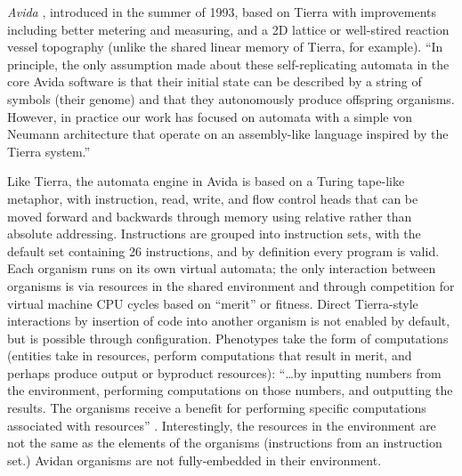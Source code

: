 \emph{Avida} \parencite{Ofria2004}, introduced in the summer of 1993, based on Tierra with improvements including better metering and measuring, and a 2D lattice or well-stired reaction vessel topography (unlike the shared linear memory of Tierra, for example). ``In principle, the only assumption made about these self-replicating automata in the core Avida software is that their initial state can be described by a string of symbols (their genome) and that they autonomously produce offspring organisms. However, in practice our work has focused on automata with a simple von Neumann architecture that operate on an assembly-like language inspired by the Tierra system.''

Like Tierra, the automata engine in Avida is based on a Turing tape-like metaphor, with instruction, read, write, and flow control heads that can be moved forward and backwards through memory using relative rather than absolute addressing. Instructions are grouped into instruction sets, with the default set containing 26 instructions, and by definition every program is valid. Each organism runs on its own virtual automata; the only interaction between organisms is via resources in the shared environment and through competition for virtual machine CPU cycles based on ``merit'' or fitness. Direct Tierra-style interactions by insertion of code into another organism is not enabled by default, but is possible through configuration. Phenotypes take the form of computations (entities take in resources, perform computations that result in merit, and perhaps produce output or byproduct resources): ``\ldots by inputting numbers from the environment, performing computations on those numbers, and outputting the results. The organisms receive a benefit for performing specific computations associated with resources'' \parencite{Ofria2004}. Interestingly, the resources in the environment are not the same as the elements of the organisms (instructions from an instruction set.) Avidan organisms are not fully-embedded in their environment.

